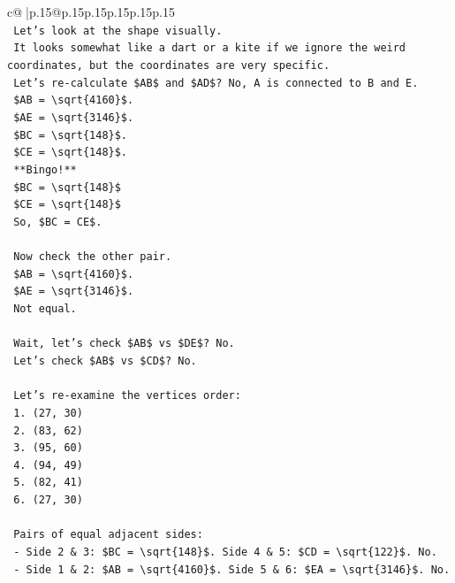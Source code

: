 \documentclass{article}
\begin{document}
{\begin{supertabular}{c@{$\;$}|p{.15\linewidth}@{}p{.15\linewidth}p{.15\linewidth}p{.15\linewidth}p{.15\linewidth}p{.15\linewidth}}
{{{\\ 
\texttt{    Let's look at the shape visually.} \\
\texttt{    It looks somewhat like a dart or a kite if we ignore the weird coordinates, but the coordinates are very specific.} \\
\texttt{    Let's re{-}calculate \$AB\$ and \$AD\$? No, A is connected to B and E.} \\
\texttt{    \$AB = \textbackslash{}sqrt\{4160\}\$.} \\
\texttt{    \$AE = \textbackslash{}sqrt\{3146\}\$.} \\
\texttt{    \$BC = \textbackslash{}sqrt\{148\}\$.} \\
\texttt{    \$CE = \textbackslash{}sqrt\{148\}\$.} \\
\texttt{    **Bingo!**} \\
\texttt{    \$BC = \textbackslash{}sqrt\{148\}\$} \\
\texttt{    \$CE = \textbackslash{}sqrt\{148\}\$} \\
\texttt{    So, \$BC = CE\$.} \\
\\ 
\texttt{    Now check the other pair.} \\
\texttt{    \$AB = \textbackslash{}sqrt\{4160\}\$.} \\
\texttt{    \$AE = \textbackslash{}sqrt\{3146\}\$.} \\
\texttt{    Not equal.} \\
\\ 
\texttt{    Wait, let's check \$AB\$ vs \$DE\$? No.} \\
\texttt{    Let's check \$AB\$ vs \$CD\$? No.} \\
\\ 
\texttt{    Let's re{-}examine the vertices order:} \\
\texttt{    1. (27, 30)} \\
\texttt{    2. (83, 62)} \\
\texttt{    3. (95, 60)} \\
\texttt{    4. (94, 49)} \\
\texttt{    5. (82, 41)} \\
\texttt{    6. (27, 30)} \\
\\ 
\texttt{    Pairs of equal adjacent sides:} \\
\texttt{    {-} Side 2 \& 3: \$BC = \textbackslash{}sqrt\{148\}\$. Side 4 \& 5: \$CD = \textbackslash{}sqrt\{122\}\$. No.} \\
\texttt{    {-} Side 1 \& 2: \$AB = \textbackslash{}sqrt\{4160\}\$. Side 5 \& 6: \$EA = \textbackslash{}sqrt\{3146\}\$. No.} \\
}}}
\end{supertabular}}
\end{document}
